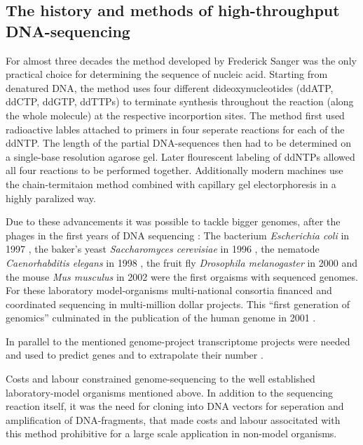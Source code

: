 \subsection{The history and methods of high-throughput DNA-sequencing}
\label{his-seq}

For almost three decades the method developed by Frederick Sanger
\cite{pmid271968} was the only practical choice for determining the
sequence of nucleic acid. Starting from denatured DNA, the method uses
four different dideoxynucleotides (ddATP, ddCTP, ddGTP, ddTTPs) to
terminate synthesis throughout the reaction (along the whole molecule)
at the respective incorportion sites.  The method first used
radioactive lables attached to primers in four seperate reactions for
each of the ddNTP. The length of the partial DNA-sequences then had to
be determined on a single-base resolution agarose gel. Later
flourescent labeling of ddNTPs allowed all four reactions to be
performed together. Additionally modern machines use the
chain-termitaion method combined with capillary gel electorphoresis
\cite{pmid2326186} in a highly paralized way.

Due to these advancements it was possible to tackle bigger genomes,
after the phages in the first years of DNA sequencing
\cite{pmid1264203}: The bacterium \textit{Escherichia coli} in 1997
\cite{pmid9278503}, the baker's yeast \textit{Saccharomyces
  cerevisiae} in 1996 \cite{pmid8849441}, the nematode
\textit{Caenorhabditis elegans} in 1998 \cite{pmid9851916}, the fruit
fly \textit{Drosophila melanogaster} in 2000 \cite{adams2000genome}
and the mouse \textit{Mus musculus} in 2002 \cite{pmid12466850} were
the first orgaisms with sequenced genomes. For these laboratory
model-organisms multi-national consortia financed and coordinated
sequencing in multi-million dollar projects. This ``first generation
of genomics'' culminated in the publication of the human genome in
2001 \cite{pmid11181995}.

In parallel to the mentioned genome-project transcriptome projects
were needed and used to predict genes and to extrapolate their number
\cite{pmid7920649}.

Costs and labour constrained genome-sequencing to the well established
laboratory-model organisms mentioned above. In addition to the
sequencing reaction itself, it was the need for cloning into DNA
vectors for seperation and amplification of DNA-fragments, that made
costs and labour associtated with this method prohibitive for a large
scale application in non-model organisms.


